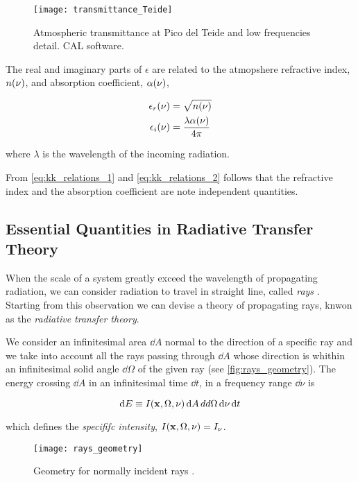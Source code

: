 \begin{figure}
        \centering
        \texttt{[image: transmittance\_Teide]}
        \caption{Atmospheric transmittance at Pico del Teide and low
        frequencies detail. CAL software.}
        \label{fig:transmittance_teide}
\end{figure}


The real and imaginary parts of $\epsilon$ are related to the atmopshere
refractive index, $n\qty(\nu)$, and absorption coefficient, $\alpha\qty(\nu)$,

\begin{align}
        \epsilon_r\qty(\nu) & = \sqrt{n\qty(\nu)} \\
        \epsilon_i\qty(\nu) & = \frac{\lambda \alpha\qty(\nu)}{4\pi}
\end{align}

where $\lambda$ is the wavelength of the incoming radiation.

From \autoref{eq:kk_relations_1} and \autoref{eq:kk_relations_2} follows that
the refractive index and the absorption coefficient are note independent
quantities.

\subsection{Essential Quantities in Radiative Transfer Theory}

When the scale of a system greatly exceed the wavelength of propagating
radiation, we can consider radiation to travel in straight line, called
\emph{rays} \autocite{rybicki2008radiative}. Starting from this observation
we can devise a theory of propagating rays, knwon as the \emph{radiative
transfer theory}.

We consider an infinitesimal area $\dd{A}$ normal to the direction of a
specific ray and we take into account all the rays passing through $\dd{A}$
whose direction is whithin an infinitesimal solid angle $\dd{\Omega}$ of
the given ray (see \autoref{fig:rays_geometry}). The energy crossing
$\dd{A}$ in an infinitesimal time $\dd{t}$, in a frequency range $\dd{\nu}$
is

\begin{equation}
        \dd{E} \equiv
        I\qty(\vb{x},\Omega,\nu)\dd{A}dd{\Omega}\dd{\nu}\dd{t}
\end{equation}

which defines the \emph{specififc intensity}, $I\qty(\vb{x},\Omega,\nu) =
I_\nu$.

\begin{figure}
        \centering
        \texttt{[image: rays\_geometry]}
        \caption{Geometry for normally incident rays
        \autocite{rybicki2008radiative}.}
        \label{fig:rays_geometry}
\end{figure}


